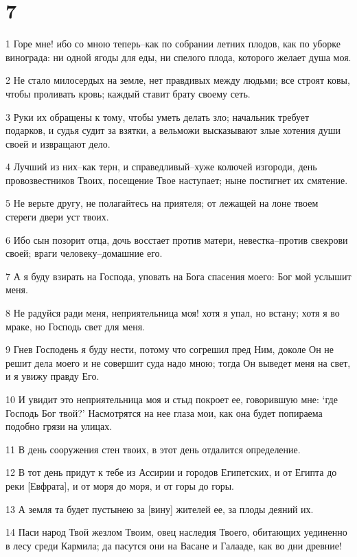 \chapter{7}

\par 1 Горе мне! ибо со мною теперь--как по собрании летних плодов, как по уборке винограда: ни одной ягоды для еды, ни спелого плода, которого желает душа моя.
\par 2 Не стало милосердых на земле, нет правдивых между людьми; все строят ковы, чтобы проливать кровь; каждый ставит брату своему сеть.
\par 3 Руки их обращены к тому, чтобы уметь делать зло; начальник требует подарков, и судья судит за взятки, а вельможи высказывают злые хотения души своей и извращают дело.
\par 4 Лучший из них--как терн, и справедливый--хуже колючей изгороди, день провозвестников Твоих, посещение Твое наступает; ныне постигнет их смятение.
\par 5 Не верьте другу, не полагайтесь на приятеля; от лежащей на лоне твоем стереги двери уст твоих.
\par 6 Ибо сын позорит отца, дочь восстает против матери, невестка--против свекрови своей; враги человеку--домашние его.
\par 7 А я буду взирать на Господа, уповать на Бога спасения моего: Бог мой услышит меня.
\par 8 Не радуйся ради меня, неприятельница моя! хотя я упал, но встану; хотя я во мраке, но Господь свет для меня.
\par 9 Гнев Господень я буду нести, потому что согрешил пред Ним, доколе Он не решит дела моего и не совершит суда надо мною; тогда Он выведет меня на свет, и я увижу правду Его.
\par 10 И увидит это неприятельница моя и стыд покроет ее, говорившую мне: `где Господь Бог твой?' Насмотрятся на нее глаза мои, как она будет попираема подобно грязи на улицах.
\par 11 В день сооружения стен твоих, в этот день отдалится определение.
\par 12 В тот день придут к тебе из Ассирии и городов Египетских, и от Египта до реки [Евфрата], и от моря до моря, и от горы до горы.
\par 13 А земля та будет пустынею за [вину] жителей ее, за плоды деяний их.
\par 14 Паси народ Твой жезлом Твоим, овец наследия Твоего, обитающих уединенно в лесу среди Кармила; да пасутся они на Васане и Галааде, как во дни древние!
